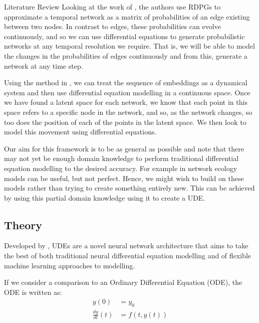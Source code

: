 \documentclass[12pt]{amsbook}
\begin{document}
\begin{chapter}{Literature Review}
        Looking at the work of \cite{sanna2021link}, the authors use RDPGs to approximate a temporal network as a matrix of probabilities of an edge existing between two nodes. In contrast to edges, these probabilities can evolve continuously, and so we can use differential equations to generate probabilistic networks at any temporal resolution we require. That is, we will be able to model the changes in the probabilities of edges continuously and from this, generate a network at any time step.

        Using the method in \cite{sanna2021link}, we can treat the sequence of embeddings as a dynamical system and then use differential equation modelling in a continuous space. Once we have found a latent space for each network, we know that each point in this space refers to a specific node in the network, and so, as the network changes, so too does the position of each of the points in the latent space. We then look to model this movement using differential equations. 
        
        Our aim for this framework is to be as general as possible and note that there may not yet be enough domain knowledge to perform traditional differential equation modelling to the desired accuracy. For example in network ecology models can be useful, but not perfect. Hence, we might wish to build on these models rather than trying to create something entirely new. This can be achieved by using this partial domain knowledge using it to create a UDE\cite{SciML_C_Rak}.

        \subsection{Theory}

            Developed by \cite{SciML_C_Rak}, UDEs are a novel neural network architecture that aims to take the best of both traditional neural differential equation modelling and of flexible machine learning approaches to modelling. 

            If we consider a comparison to an Ordinary Differential Equation (ODE), the ODE is written as:
            \begin{align}
                y(0) &= y_0 \\
                \frac{dy}{dt}(t)&=f(t,y(t))
            \end{align}
            

\end{chapter}
\end{document}
